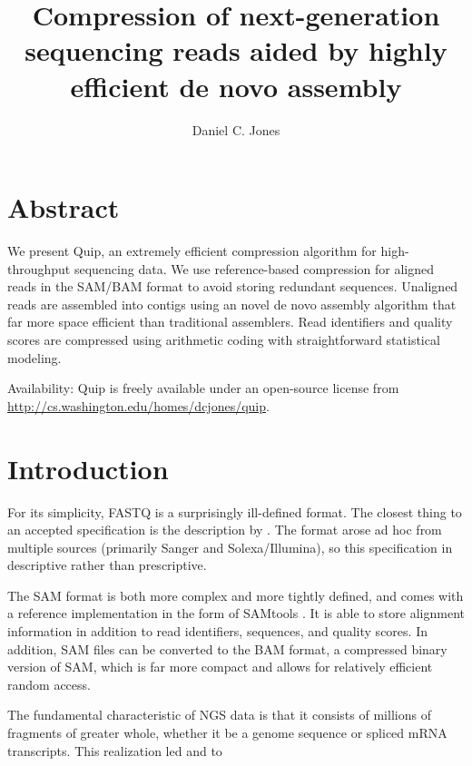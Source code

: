 \documentclass[twocolumn]{article}
\title{Compression of next-generation sequencing reads aided by highly efficient de novo assembly}
\author{Daniel C. Jones}
\begin{document}
\maketitle

\section{Abstract}

We present Quip, an extremely efficient compression algorithm for
high-throughput sequencing data.  We use reference-based compression for aligned
reads in the SAM/BAM format to avoid storing redundant sequences.  Unaligned
reads are assembled into contigs using an novel de novo assembly algorithm that
far more space efficient than traditional assemblers.  Read identifiers and
quality scores are compressed using arithmetic coding with straightforward
statistical modeling.

Availability: Quip is freely available under an open-source license from
\url{http://cs.washington.edu/homes/dcjones/quip}.


\section{Introduction}




For its simplicity, FASTQ is a surprisingly ill-defined format. The closest
thing to an accepted specification is the description by \citet{Cock2010}. The
format arose ad hoc from multiple sources (primarily Sanger and
Solexa/Illumina), so this specification in descriptive rather than
prescriptive.

The SAM format is both more complex and more tightly defined, and comes with a
reference implementation in the form of SAMtools \citep{Li2009b}. It is able to
store alignment information in addition to read identifiers, sequences, and
quality scores. In addition, SAM files can be converted to the BAM format, a
compressed binary version of SAM, which is far more compact and allows for
relatively efficient random access. 




The fundamental characteristic of NGS data is that it consists of millions of
fragments of greater whole, whether it be a genome sequence or spliced mRNA
transcripts. This realization led \citet{Kozanitis2011} and
\citet{Hsi-YangFritz2011} to 
\end{document}
